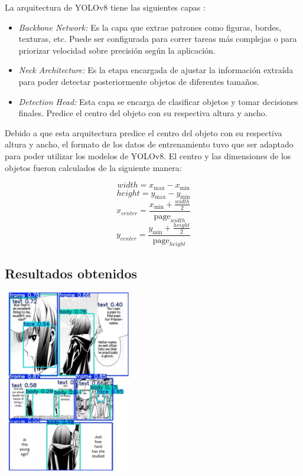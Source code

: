 \documentclass[conference]{IEEEtran}
\begin{document}
La arquitectura de YOLOv8 tiene las siguientes capas \cite{torres2025yolov8}:
\begin{itemize}
  \item \emph{Backbone Network:} Es la capa que extrae patrones como figuras, bordes, texturas, etc. Puede ser configurada para correr tareas más complejas o para priorizar velocidad sobre precisión según la aplicación.
  \item \emph{Neck Architecture:} Es la etapa encargada de ajustar la información extraída para poder detectar posteriormente objetos de diferentes tamaños.
  \item \emph{Detection Head:} Esta capa se encarga de clasificar objetos y tomar decisiones finales. Predice el centro del objeto con su respectiva altura y ancho.
\end{itemize}

Debido a que esta arquitectura predice el centro del objeto con su respectiva altura y ancho, el formato de los datos de entrenamiento tuvo que ser adaptado para poder utilizar los modelos de YOLOv8. El centro y las dimensiones de los objetos fueron calculados de la siguiente manera:

\[width = x_{\max} - x_{\min}\]
\[height = y_{\max} - y_{\min}\]
\[x_{center} = \frac{x_{\min} + \frac{width}{2}}{\mathrm{page}_{width}}\]
\[y_{center} = \frac{y_{\min} + \frac{height}{2}}{\mathrm{page}_{height}}\]

\subsection{Resultados obtenidos}\label{resultados-obtenidos}
\includegraphics[width=2.20231in,height=3.158in]{resources/Picture1.jpg}
\end{document}
